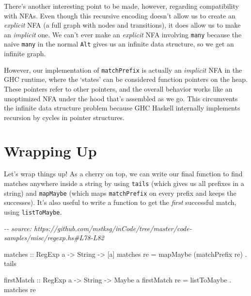 \documentclass[]{article}
\newenvironment{Shaded}{}{}
\newcommand{\CommentTok}[1]{\textcolor[rgb]{0.38,0.63,0.69}{\textit{#1}}}
\newcommand{\DataTypeTok}[1]{\textcolor[rgb]{0.56,0.13,0.00}{#1}}
\newcommand{\NormalTok}[1]{#1}
\newcommand{\OperatorTok}[1]{\textcolor[rgb]{0.40,0.40,0.40}{#1}}
\newcommand{\OtherTok}[1]{\textcolor[rgb]{0.00,0.44,0.13}{#1}}
\begin{document}
There's another interesting point to be made, however, regarding compatibility
with NFAs. Even though this recursive encoding doesn't allow us to create an
\emph{explicit} NFA (a full graph with nodes and transitions), it does allow us
to make an \emph{implicit} one. We can't ever make an \emph{explicit} NFA
involving \texttt{many} because the naive \texttt{many} in the normal
\texttt{Alt} gives us an infinite data structure, so we get an infinite graph.

However, our implementation of \texttt{matchPrefix} is actually an
\emph{implicit} NFA in the GHC runtime, where the `states' can be considered
function pointers on the heap. These pointers refer to other pointers, and the
overall behavior works like an unoptimized NFA under the hood that's assembled
as we go. This circumvents the infinite data structure problem because GHC
Haskell internally implements recursion by cycles in pointer structures.

\section{Wrapping Up}\label{wrapping-up}

Let's wrap things up! As a cherry on top, we can write our final function to
find matches anywhere inside a string by using \texttt{tails} (which gives us
all prefixes in a string) and \texttt{mapMaybe} (which maps \texttt{matchPrefix}
on every prefix and keeps the successes). It's also useful to write a function
to get the \emph{first} successful match, using \texttt{listToMaybe}.

\begin{Shaded}
\begin{Highlighting}[]
\CommentTok{{-}{-} source: https://github.com/mstksg/inCode/tree/master/code{-}samples/misc/regexp.hs\#L78{-}L82}

\OtherTok{matches ::} \DataTypeTok{RegExp}\NormalTok{ a }\OtherTok{{-}\textgreater{}} \DataTypeTok{String} \OtherTok{{-}\textgreater{}}\NormalTok{ [a]}
\NormalTok{matches re }\OtherTok{=}\NormalTok{ mapMaybe (matchPrefix re) }\OperatorTok{.}\NormalTok{ tails}

\OtherTok{firstMatch ::} \DataTypeTok{RegExp}\NormalTok{ a }\OtherTok{{-}\textgreater{}} \DataTypeTok{String} \OtherTok{{-}\textgreater{}} \DataTypeTok{Maybe}\NormalTok{ a}
\NormalTok{firstMatch re }\OtherTok{=}\NormalTok{ listToMaybe }\OperatorTok{.}\NormalTok{ matches re}
\end{Highlighting}
\end{Shaded}
\end{document}
